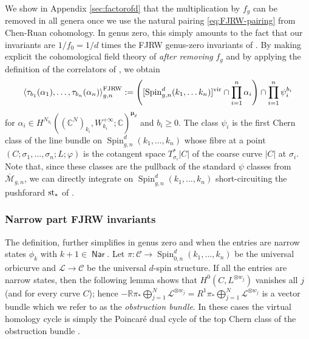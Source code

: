 \documentclass[11pt]{amsart}
\theoremstyle{definition} %
\theoremstyle{remark} %
\newcommand{\CC}{\mathbb C}
\newcommand{\RR}{\mathbb R}
\providecommand{\abs}[1]{\lvert#1\rvert}
\def\vir{{\rm vir}}
\def\ol{\overline}
\def\corr#1{\left\langle #1 \right\rangle}
\newcommand{\bmu}{\boldsymbol{\mu}}
\newcommand{\cC}{\mathcal{C}}
\newcommand{\cL}{\mathcal{L}}
\newcommand{\Nar}{\operatorname{\mathsf{Nar}}}
\newcommand{\FJRW}{{\operatorname{FJRW}}}
\newcommand{\Spin}{\operatorname{Spin}}
\begin{document}
We show in Appendix \ref{sec:factorofd} that 
the multiplication by $f_g$ can be 
removed in all genera once we use the natural pairing 
\eqref{eq:FJRW-pairing} from Chen-Ruan cohomology. 
In genus zero, this simply 
amounts to the fact that our invariants are $1/f_0=1/d$ times the 
FJRW genus-zero invariants of \cite{FJR1}. 
By making explicit the cohomological field theory of \cite[Definition 4.2.1]{FJR1} 
\emph{after removing} $f_g$ %
and by applying the definition of the correlators of \cite[Definition 4.2.6]{FJR1},
we obtain 
\begin{equation}\label{eq:fullFJRWinv}
\corr{\tau_{b_1} (\alpha_1),\dots, \tau_{b_n} (\alpha_n)}_{g,n}^{\FJRW} 
 := \left([\Spin_{g,n}^d(k_1,\dots k_n)]^{\vir}\cap 
\prod_{i=1}^n \alpha_i \right)\cap \prod_{i=1}^{n} \psi_i^{b_i}
\end{equation}		
for $\alpha_i\in H^{N_{k_i}} 
((\CC^N)_{k_i}, W_{k_i}^{+\infty};\CC)^{\bmu_d}$ and 
$b_i\ge 0$. 
The class $\psi_i$ is the first Chern class of the 
line bundle on $\Spin^d_{g,n}(k_1,\dots,k_n)$ 
whose fibre at a point $(C;\sigma_1,\dots,\sigma_n;L;\varphi)$ 
is the cotangent space $T_{\sigma_i}^*|C|$ 
of the coarse curve $|C|$ at $\sigma_i$. 
Note that, since these classes 
are the pullback of the standard $\psi$ classes 
from $\ol{\mathcal M}_{g,n}$, we can directly integrate
on $\Spin^d_{g,n}(k_1,\dots,k_n)$ 
short-circuiting the pushforard 
$\rm{st}_*$ of \cite[Definition 4.2.1]{FJR1}. 

\subsubsection{Narrow part FJRW invariants} 
\label{subsubsec:narrowFJRW}
The definition, further simplifies in genus zero 
and when the entries are narrow states $\phi_k$ with $k+1\in \Nar$.
Let $\pi \colon \cC \to \Spin^d_{0,n}(k_1,\dots,k_n)$ be the 
universal orbicurve and $\cL\to \cC$ be the universal $d$-spin structure. 
If all the entries are narrow states, 
then the following lemma shows that  
 $H^0(C, L^{\otimes w_j})$ vanishes all $j$ 
(and for every curve $C$); 
hence $-\RR\pi_* \bigoplus_{j=1}^N \cL^{\otimes w_j}
= R^1\pi_* \bigoplus_{j=1}^N \cL^{\otimes w_j}$
is a vector bundle which we refer to as the \emph{obstruction 
bundle}. 
In these cases the virtual homology cycle is simply 
the Poincar\'e dual cycle of the top Chern class 
of the obstruction bundle 
\cite[Theorem 4.1.8, Concavity]{FJR1}. 
\end{document}
